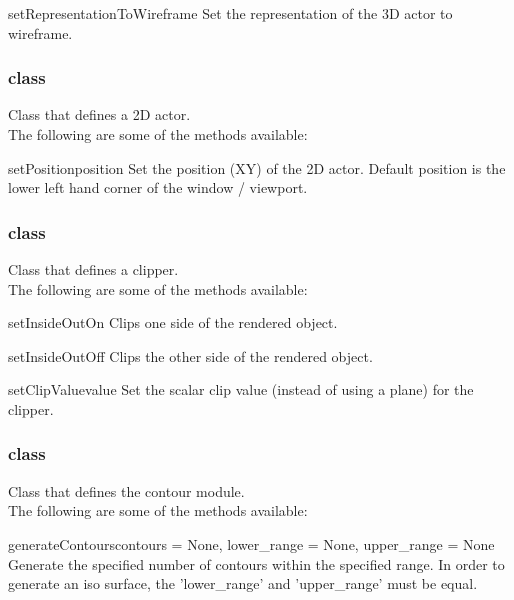 \begin{methoddesc}[Actor3D]{setRepresentationToWireframe}{}
Set the representation of the 3D actor to wireframe.
\end{methoddesc}

\subsubsection{\ActorTwoD class}
Class that defines a 2D actor. \\

The following are some of the methods available:

\begin{methoddesc}[Actor2D]{setPosition}{position}
Set the position (XY) of the 2D actor. Default position is the lower left hand
corner of the window / viewport.
\end{methoddesc}

\subsubsection{\Clipper class}
Class that defines a clipper. \\

The following are some of the methods available:

\begin{methoddesc}[Clipper]{setInsideOutOn}{}
Clips one side of the rendered object.
\end{methoddesc}

\begin{methoddesc}[Clipper]{setInsideOutOff}{}
Clips the other side of the rendered object.
\end{methoddesc}

\begin{methoddesc}[Clipper]{setClipValue}{value}
Set the scalar clip value (instead of using a plane) for the clipper.
\end{methoddesc}

\subsubsection{\ContourModule class}
Class that defines the contour module. \\

The following are some of the methods available:

\begin{methoddesc}[ContourModule]{generateContours}{contours = None, 
lower_range = None, upper_range = None}
Generate the specified number of contours within the specified range.
In order to generate an iso surface, the 'lower_range' and 'upper_range' 
must be equal.
\end{methoddesc}

